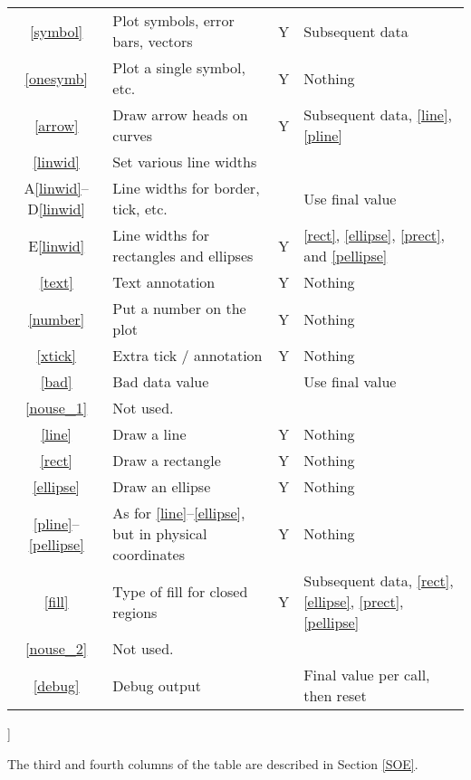 \documentclass[twoside]{MATH77}
\begin{document}
\begin{multicols}{2}
\begin{center}
\begin{tabular}{|c|p{2.55in}|c|p{2.35in}|}
\ref{symbol}  &   Plot symbols, error bars, vectors
   & Y & Subsequent data  \\
\ref{onesymb} &   Plot a single symbol, etc.
   & Y & Nothing  \\
\ref{arrow}   &   Draw arrow heads on curves
   & Y & Subsequent data, \ref{line}, \ref{pline}  \\
\ref{linwid}  & Set various line widths & & \\
A\ref{linwid}--D\ref{linwid}
   & Line widths for border, tick, etc. &   & Use final value\\
E\ref{linwid} & Line widths for rectangles and ellipses
   & Y & \ref{rect}, \ref{ellipse}, \ref{prect}, and \ref{pellipse} \\
\ref{text}    &   Text annotation
   & Y & Nothing  \\
\ref{number}  &   Put a number on the plot
   & Y & Nothing  \\
\ref{xtick}   &   Extra tick / annotation
   & Y & Nothing  \\
\ref{bad}     &   Bad data value
   &   & Use final value \\
\ref{nouse_1} &  Not used. & & \\
\ref{line}   &   Draw a line
   & Y & Nothing  \\
\ref{rect}    &   Draw a rectangle
   & Y & Nothing  \\
\ref{ellipse} &   Draw an ellipse
   & Y & Nothing  \\
\ref{pline}--\ref{pellipse} & As for \ref{line}--\ref{ellipse}, but in
physical coordinates & Y & Nothing  \\
\ref{fill}    &   Type of fill for closed regions
   & Y & Subsequent data, \ref{rect}, \ref{ellipse}, \ref{prect},
     \ref{pellipse} \\
\ref{nouse_2} &  Not used. & & \\
\ref{debug}   &   Debug output
   &   & Final value per call, then reset \\
\hline
\end{tabular}
\end{center}
]

The third and fourth columns of the table are described in Section
\ref{SOE}.


\end{multicols}
\end{document}
